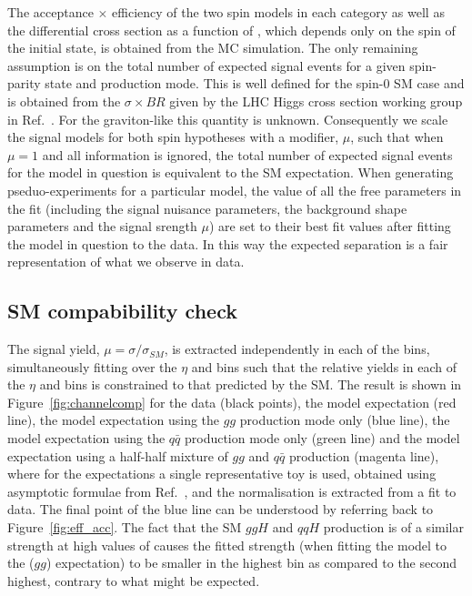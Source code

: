 The acceptance $\times$ efficiency of the two spin models in each category as well as the differential cross section as a function of \abscostheta, which depends only on the spin of the initial state, is obtained from the MC simulation. The only remaining assumption is on the total number of expected signal events for a given spin-parity state and production mode. This is well defined for the spin-0 SM case and is obtained from the $\sigma\times BR$ given by the LHC Higgs cross section working group in Ref.~\cite{LHCHiggsCrossSectionWorkingGroup3}. For the graviton-like \twomp this quantity is unknown. 
Consequently we scale the signal models for both spin hypotheses with a modifier, $\mu$, such that when $\mu=1$ and all \costhetastar information is ignored, the total number of expected signal events for the model in question is equivalent to the SM expectation. 
When generating pseduo-experiments for a particular model, the value of all the free parameters in the fit (including the signal nuisance parameters, the background shape parameters and the signal srength $\mu$) are set to their best fit values after fitting the model in question to the data.
In this way the expected separation is a fair representation of what we observe in data.

\subsection{SM compabibility check}
The signal yield, $\mu=\sigma/\sigma_{SM}$, is extracted independently in each of the \abscostheta bins, 
simultaneously fitting over the $\eta$ and \rnine bins such that the relative yields in each of the $\eta$ and \rnine 
bins is constrained to that predicted by the SM. The result is shown in Figure~\ref{fig:channelcomp} for the data (black points), the \zerop model expectation (red line), the \twomp model expectation using the $gg$ production mode only (blue line), the \twomp model expectation using the $q\bar{q}$ production mode only (green line) and the \twomp model expectation using a half-half mixture of $gg$ and $q\bar{q}$ production (magenta line), where for the expectations a single representative toy is used, obtained using asymptotic formulae from Ref.~\cite{asymptotic_form}, and the normalisation is extracted from a fit to data. The final point of the blue line can be understood
by referring back to Figure~\ref{fig:eff_acc}. The fact that the SM $ggH$ and $qqH$ production is of a similar strength at high values of \abscostheta causes the 
fitted strength (when fitting the \zerop model to the \twomp($gg$) expectation) to be smaller in the highest \abscostheta bin as compared to the second highest, contrary to what might be expected. 

